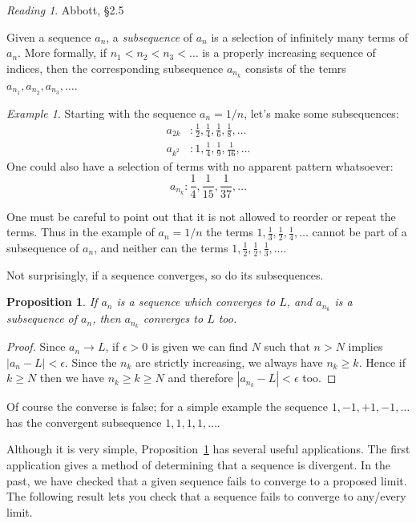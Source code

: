 \documentclass[11pt,oneside]{amsbook}
\theoremstyle{definition}
\theoremstyle{plain}
\newtheorem{proposition}[theorem]{Proposition}
\theoremstyle{definition}
\theoremstyle{remark}
\newtheorem{example}[theorem]{Example}
\newtheorem*{reading}{Reading}
\numberwithin{equation}{section}
\numberwithin{figure}{section}
\begin{document}
\begin{reading}
  Abbott, \S 2.5
\end{reading}

Given a sequence $a_n$, a \emph{subsequence} of $a_n$ is a selection of infinitely many terms of $a_n$. More formally, if $n_1<n_2<n_3<\ldots$ is a properly increasing sequence of indices, then the corresponding subsequence $a_{n_k}$ consists of the temrs $a_{n_1},a_{n_2},a_{n_3},\ldots$.

\begin{example}
  Starting with the sequence $a_n=1/n$, let's make some subsequences:
  \begin{align*}
    a_{2k}&: \frac12, \frac14, \frac16, \frac18, \ldots\\
    a_{k^2}&: 1, \frac14, \frac19, \frac1{16}, \ldots
  \end{align*}
  One could also have a selection of terms with no apparent pattern whatsoever:
  \[a_{n_k}:\frac14, \frac{1}{15}, \frac{1}{37},\ldots
  \]
\end{example}

One must be careful to point out that it is not allowed to reorder or repeat the terms. Thus in the example of $a_n=1/n$ the terms $1,\frac13,\frac12,\frac14,\ldots$ cannot be part of a subsequence of $a_n$, and neither can the terms $1,\frac12,\frac12,\frac13,\ldots$.

Not surprisingly, if a sequence converges, so do its subsequences.

\begin{proposition}
  \label{prop:subsequence}
  If $a_n$ is a sequence which converges to $L$, and $a_{n_k}$ is a subsequence of $a_n$, then $a_{n_k}$ converges to $L$ too.
\end{proposition}

\begin{proof}
  Since $a_n\to L$, if $\epsilon>0$ is given we can find $N$ such that $n>N$ implies $|a_n-L|<\epsilon$. Since the $n_k$ are strictly increasing, we always have $n_k\geq k$. Hence if $k\geq N$ then we have $n_k\geq k\geq N$ and therefore $|a_{n_k}-L|<\epsilon$ too.
\end{proof}

Of course the converse is false; for a simple example the sequence $1,-1,+1,-1,\ldots$ has the convergent subsequence $1,1,1,1,\ldots$.

Although it is very simple, Proposition~\ref{prop:subsequence} has several useful applications. The first application gives a method of determining that a sequence is divergent. In the past, we have checked that a given sequence fails to converge to a proposed limit. The following result lets you check that a sequence fails to converge to any/every limit.
\end{document}
